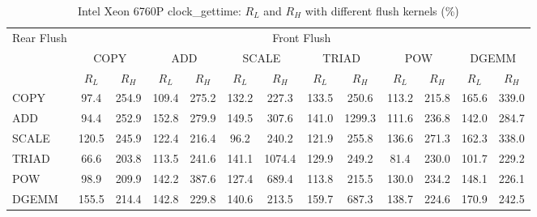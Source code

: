 \begin{table}[htbp]
\centering
\caption{Intel Xeon 6760P clock\_gettime: $R_L$ and $R_H$ with different flush kernels (\%)}
\label{tab:frkern-cgnr6760pn2-clock_gettime}
\begin{tabular*}{\textwidth}{@{\extracolsep{\fill}}lcccccccccccc}
\toprule
\multirow{3}{*}{Rear Flush} & \multicolumn{12}{c}{Front Flush} \\ \cmidrule(lr){2-13}
& \multicolumn{2}{c}{COPY} & \multicolumn{2}{c}{ADD} & \multicolumn{2}{c}{SCALE} & \multicolumn{2}{c}{TRIAD} & \multicolumn{2}{c}{POW} & \multicolumn{2}{c}{DGEMM} \\ \cmidrule(lr){2-3} \cmidrule(lr){4-5} \cmidrule(lr){6-7} \cmidrule(lr){8-9} \cmidrule(lr){10-11} \cmidrule(lr){12-13}
& $R_L$ & $R_H$ & $R_L$ & $R_H$ & $R_L$ & $R_H$ & $R_L$ & $R_H$ & $R_L$ & $R_H$ & $R_L$ & $R_H$ \\ \midrule
COPY & 97.4 & 254.9 & 109.4 & 275.2 & 132.2 & 227.3 & 133.5 & 250.6 & 113.2 & 215.8 & 165.6 & 339.0 \\
ADD & 94.4 & 252.9 & 152.8 & 279.9 & 149.5 & 307.6 & 141.0 & 1299.3 & 111.6 & 236.8 & 142.0 & 284.7 \\
SCALE & 120.5 & 245.9 & 122.4 & 216.4 & 96.2 & 240.2 & 121.9 & 255.8 & 136.6 & 271.3 & 162.3 & 338.0 \\
TRIAD & 66.6 & 203.8 & 113.5 & 241.6 & 141.1 & 1074.4 & 129.9 & 249.2 & 81.4 & 230.0 & 101.7 & 229.2 \\
POW & 98.9 & 209.9 & 142.2 & 387.6 & 127.4 & 689.4 & 113.8 & 215.5 & 130.0 & 234.2 & 148.1 & 226.1 \\
DGEMM & 155.5 & 214.4 & 142.8 & 229.8 & 140.6 & 213.5 & 159.7 & 687.3 & 138.7 & 224.6 & 170.9 & 242.5 \\
\bottomrule
\end{tabular*}
\end{table}